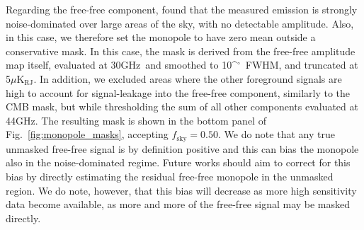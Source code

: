 \documentclass{aa}
\def\,{\thinspace}
\def\deg{\ifmmode^\circ\else$^\circ$\fi}
\def\GHz{\ifmmode \,\mathrm{GHz}\else \,GHz\fi}
\def\muKRJ{\ifmmode \,\mu\mathrm{K_{RJ}}\else \,$\mu$K$_{\mathrm{RJ}}$\fi}
\begin{document}
Regarding the free-free component, \citet{planck2014-a12} found that
the measured emission is strongly noise-dominated over large areas of
the sky, with no detectable amplitude. Also, in this case, we therefore
set the monopole to have zero mean outside a conservative mask.  In
this case, the mask is derived from the free-free amplitude map
itself, evaluated at 30\GHz\ and smoothed to 10\deg\ FWHM, and
truncated at 5\muKRJ. In addition, we excluded areas where the other
foreground signals are high to account for signal-leakage into the
free-free component, similarly to the CMB mask, but while thresholding the sum
of all other components evaluated at 44\GHz. The resulting mask is
shown in the bottom panel of Fig.~\ref{fig:monopole_masks},
accepting $f_{\mathrm{sky}}=0.50$. We do note that any true unmasked
free-free signal is by definition positive and this can bias the
monopole also in the noise-dominated regime. Future works should aim to
correct for this bias by directly estimating the residual free-free
monopole in the unmasked region. We do note, however, that this
bias will decrease as more high sensitivity data become available, as
more and more of the free-free signal may be masked directly. 
\end{document}
